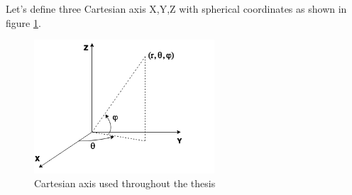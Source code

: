 Let's define three Cartesian axis X,Y,Z with spherical coordinates as shown in figure \ref{fig:3daxis}.

\begin{figure}[H]
    \centering
    \includegraphics[width=0.6\textwidth]{Figures/3dCoord.png}
    \caption{Cartesian axis used throughout the thesis}
    \label{fig:3daxis}
\end{figure}

